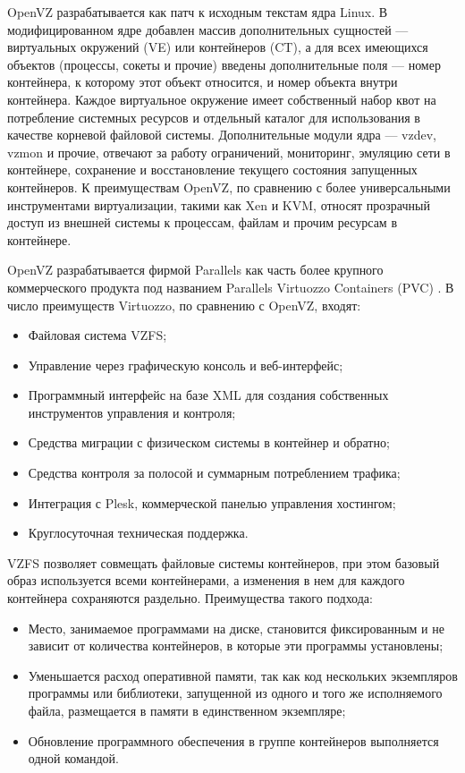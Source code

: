 OpenVZ разрабатывается как патч к исходным текстам ядра Linux.
В модифицированном ядре добавлен массив дополнительных сущностей --- виртуальных окружений (VE) или контейнеров (CT), а для всех имеющихся объектов (процессы, сокеты и прочие) введены дополнительные поля --- номер контейнера, к которому этот объект относится, и номер объекта внутри контейнера.
Каждое виртуальное окружение имеет собственный набор квот на потребление системных ресурсов и отдельный каталог для использования в качестве корневой файловой системы.
Дополнительные модули ядра --- vzdev, vzmon и прочие, отвечают за работу ограничений, мониторинг, эмуляцию сети в контейнере, сохранение и восстановление текущего состояния запущенных контейнеров.
К преимуществам OpenVZ, по сравнению с более универсальными инструментами виртуализации, такими как Xen и KVM, относят прозрачный доступ из внешней системы к процессам, файлам и прочим ресурсам в контейнере.

OpenVZ разрабатывается фирмой Parallels как часть более крупного коммерческого продукта под названием Parallels Virtuozzo Containers (PVC) \cite{lxc-openvz}.
В число преимуществ Virtuozzo, по сравнению с OpenVZ, входят:
\begin{itemize}
  \item Файловая система VZFS;
  \item Управление через графическую консоль и веб-интерфейс;
  \item Программный интерфейс на базе XML для создания собственных инструментов управления и контроля;
  \item Средства миграции с физическом системы в контейнер и обратно;
  \item Средства контроля за полосой и суммарным потреблением трафика;
  \item Интеграция с Plesk, коммерческой панелью управления хостингом;
  \item Круглосуточная техническая поддержка.
\end{itemize}

VZFS позволяет совмещать файловые системы контейнеров, при этом базовый образ используется всеми контейнерами, а изменения в нем для каждого контейнера сохраняются раздельно.
Преимущества такого подхода:
\begin{itemize}
  \item Место, занимаемое программами на диске, становится фиксированным и не зависит от количества контейнеров, в которые эти программы установлены;
  \item Уменьшается расход оперативной памяти, так как код нескольких экземпляров программы или библиотеки, запущенной из одного и того же исполняемого файла, размещается в памяти в единственном экземпляре;
  \item Обновление программного обеспечения в группе контейнеров выполняется одной командой.
\end{itemize}

